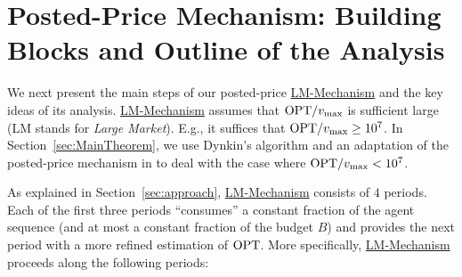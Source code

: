 \section{Posted-Price Mechanism: Building Blocks and Outline of the Analysis}
\label{sec:mech}

We next present the main steps of our posted-price \hyperref[alg:LMMECH]{LM-Mechanism} and the key ideas of its analysis. \hyperref[alg:LMMECH]{LM-Mechanism} assumes that $\mathrm{OPT} / v_{\text{max}}$ is sufficient large (LM stands for \emph{Large Market}). E.g., it suffices that $\mathrm{OPT} / v_{\text{max}} \geq 10^7$. In Section~\ref{sec:MainTheorem}, we use Dynkin's algorithm \cite{Dynkin63} and an adaptation of the posted-price mechanism in \cite[Section~4]{Bada2012} to deal with the case where $\mathrm{OPT} / v_{\text{max}} < 10^7$. 

As explained in Section~\ref{sec:approach}, \hyperref[alg:LMMECH]{LM-Mechanism} consists of $4$ periods. Each of the first three periods ``consumes'' a constant fraction of the agent sequence (and at most a constant fraction of the budget $B$) and provides the next period with a more refined estimation of $\mathrm{OPT}$. More specifically, \hyperref[alg:LMMECH]{LM-Mechanism} proceeds along the following periods: 
%
